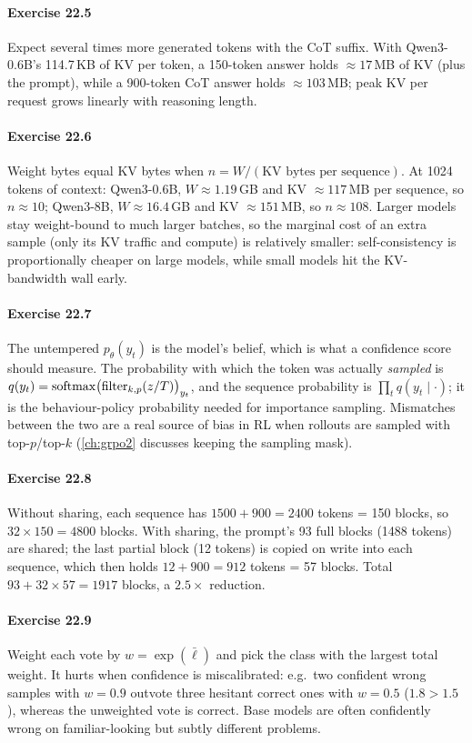 \paragraph{Exercise 22.5} Expect several times more generated tokens with the CoT suffix. With
Qwen3-0.6B's 114.7\,KB of KV per token, a 150-token answer holds $\approx 17$\,MB of KV (plus the
prompt), while a 900-token CoT answer holds $\approx 103$\,MB; peak KV per request grows linearly
with reasoning length.

\paragraph{Exercise 22.6} Weight bytes equal KV bytes when
$n = W / (\text{KV bytes per sequence})$. At 1024 tokens of context: Qwen3-0.6B,
$W \approx 1.19$\,GB and KV $\approx 117$\,MB per sequence, so $n \approx 10$; Qwen3-8B,
$W \approx 16.4$\,GB and KV $\approx 151$\,MB, so $n \approx 108$. Larger models stay weight-bound to
much larger batches, so the marginal cost of an extra sample (only its KV traffic and compute) is
relatively smaller: self-consistency is proportionally cheaper on large models, while small models
hit the KV-bandwidth wall early.

\paragraph{Exercise 22.7} The untempered $p_\theta(y_t)$ is the model's belief, which is what a
confidence score should measure. The probability with which the token was actually \emph{sampled}
is $q(y_t) = \operatorname{softmax}\bigl(\mathrm{filter}_{k,p}(z/T)\bigr)_{y_t}$, and the sequence probability is
$\prod_t q(y_t \mid \cdot)$; it is the behaviour-policy probability needed for importance sampling.
Mismatches between the two are a real source of bias in RL when rollouts are sampled with
top-$p$/top-$k$ (\cref{ch:grpo2} discusses keeping the sampling mask).

\paragraph{Exercise 22.8} Without sharing, each sequence has $1500 + 900 = 2400$ tokens = 150 blocks,
so $32 \times 150 = 4800$ blocks. With sharing, the prompt's 93 full blocks (1488 tokens) are shared;
the last partial block (12 tokens) is copied on write into each sequence, which then holds
$12 + 900 = 912$ tokens = 57 blocks. Total $93 + 32 \times 57 = 1917$ blocks, a $2.5\times$
reduction.

\paragraph{Exercise 22.9} Weight each vote by $w = \exp(\bar\ell)$ and pick the class with the
largest total weight. It hurts when confidence is miscalibrated: e.g.\ two confident wrong samples
with $w = 0.9$ outvote three hesitant correct ones with $w = 0.5$ ($1.8 > 1.5$), whereas the
unweighted vote is correct. Base models are often confidently wrong on familiar-looking but
subtly different problems.
